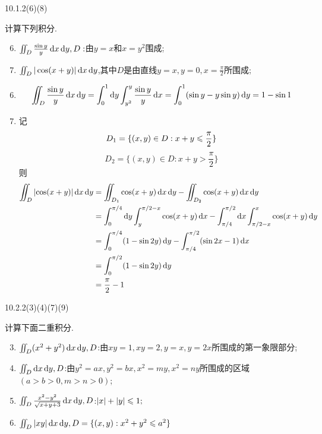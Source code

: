 \begin{exercise}
    {10.1.2(6)(8)}

    计算下列积分.
    \begin{enumerate}
        \setcounter{enumi}{5}  
        \item $\iint_D \frac{\sin y}{y} \operatorname{d\!} x \operatorname{d\!} y,D:$由$y=x$和$x=y^2$围成;
        \setcounter{enumi}{7}
        \item $\iint_D | \cos (x+y) | \operatorname{d\!} x \operatorname{d\!} y$,其中$D$是由直线$y=x,y=0,x=\frac{\pi}{2}$所围成;
    \end{enumerate}
\end{exercise}

\begin{solution}
    \begin{enumerate}
        \setcounter{enumi}{5}
        \item \[
\iint_D \frac{\sin y}{y} \operatorname{d\!} x \operatorname{d\!} y = \int_0^1 \operatorname{d\!} y \int_{y^2}^y \frac{\sin y}{y} \operatorname{d\!} x = \int_0^1 (\sin y - y \sin y) \operatorname{d\!} y = 1 - \sin 1
\]
        \setcounter{enumi}{7}
        \item 记
        $$D_1 = \{ (x,y) \in D: x+y \leqslant \frac{\pi}{2} \}$$
        $$D_2 = \{ (x,y) \in D: x+y > \frac{\pi}{2} \}$$
        则
        \begin{align*}
            \iint_{D} |{\cos(x+y)} | \dif x \dif y 
            &= \iint_{D_1} \cos(x+y) \dif x \dif y - \iint_{D_2} \cos(x+y) \dif x \dif y \\
            &= \int_0^{\pi/4} \dif y \int_y^{\pi/2 - x} \cos(x+y) \dif x 
                - \int_{\pi/4}^{\pi/2} \dif x \int_{\pi/2 - x}^x \cos(x+y) \dif y \\
            &= \int_0^{\pi/4} (1 - \sin 2y) \dif y - \int_{\pi/4}^{\pi/2} (\sin 2x - 1) \dif x \\
            &= \int_0^{\pi/2} (1 - \sin 2y) \dif y \\
            &= \frac{\pi}{2} - 1
            \end{align*}
    \end{enumerate}
\end{solution}


\begin{exercise}
    {10.2.2(3)(4)(7)(9)}

    计算下面二重积分.
    \begin{enumerate}
        \setcounter{enumi}{2}
        \item $\iint_D (x^2+y^2) \operatorname{d\!} x \operatorname{d\!} y,D$:由$xy=1,xy=2,y=x,y=2x$所围成的第一象限部分;
        \setcounter{enumi}{3}
        \item $\iint_D \operatorname{d\!} x \operatorname{d\!} y, D$:由$y^2 = ax ,y^2 = bx, x^2=my , x^2 = ny$所围成的区域$(a > b> 0, m>n>0)$;
        \setcounter{enumi}{6}
        \item $\iint_D \frac{x^2 -y^2}{\sqrt{x+y+3}} \operatorname{d\!} x \operatorname{d\!} y,D$:$|x| + |y| \leqslant 1;$
        \setcounter{enumi}{8}
        \item $\iint_D |xy| \operatorname{d\!} x \operatorname{d\!} y,D= \{ (x,y) : x^2 + y^2 \leqslant a^2 \}$
    \end{enumerate}
\end{exercise}

